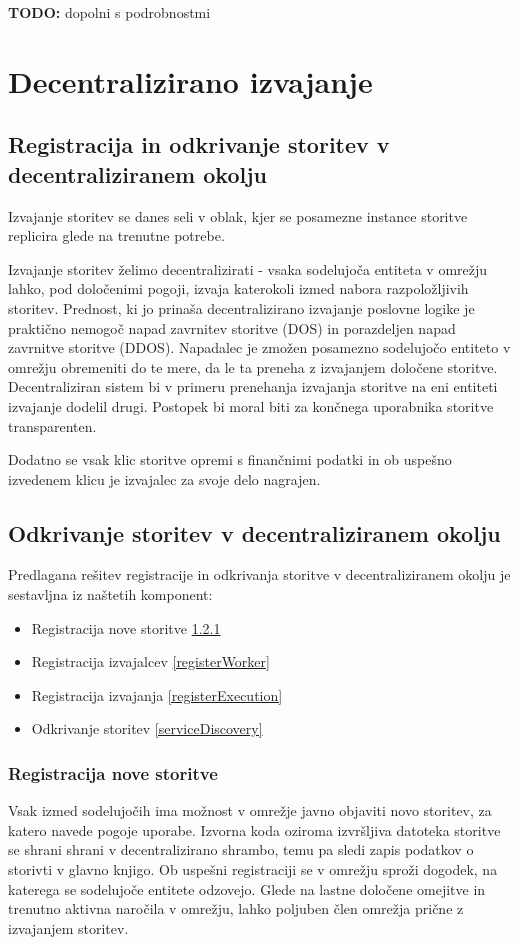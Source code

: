 \documentclass[a4paper, 12pt]{book}
\begin{document}
\textbf{TODO:} dopolni s podrobnostmi

\chapter{Decentralizirano izvajanje}
\label{ch4}

\section{Registracija in odkrivanje storitev v decentraliziranem okolju}

Izvajanje storitev se danes seli v oblak, kjer se posamezne instance storitve replicira glede na trenutne potrebe.

Izvajanje storitev želimo decentralizirati - vsaka sodelujoča entiteta v omrežju lahko, pod določenimi pogoji, izvaja
katerokoli izmed nabora razpoložljivih storitev.
Prednost, ki jo prinaša decentralizirano izvajanje poslovne logike je praktično nemogoč napad zavrnitev storitve (DOS) in
porazdeljen napad zavrnitve storitve (DDOS).
Napadalec je zmožen posamezno sodelujočo entiteto v omrežju obremeniti do te mere, da le ta preneha z izvajanjem določene storitve.
Decentraliziran sistem bi v primeru prenehanja izvajanja storitve na eni entiteti izvajanje dodelil drugi. Postopek bi moral biti za končnega uporabnika storitve transparenten.

Dodatno se vsak klic storitve opremi s finančnimi podatki in ob uspešno izvedenem klicu je izvajalec za svoje delo nagrajen.

\section{Odkrivanje storitev v decentraliziranem okolju}
Predlagana rešitev registracije in odkrivanja storitve v decentraliziranem okolju je sestavljna iz naštetih komponent:
\begin{itemize}
	\item Registracija nove storitve \ref{registerService}
	\item Registracija izvajalcev \ref{registerWorker}
	\item Registracija izvajanja \ref{registerExecution}
	\item Odkrivanje storitev \ref{serviceDiscovery}
\end{itemize}

\subsection{Registracija nove storitve}
\label{registerService}
Vsak izmed sodelujočih ima možnost v omrežje javno objaviti novo storitev, za katero navede pogoje uporabe.
Izvorna koda oziroma izvršljiva datoteka storitve se shrani shrani v decentralizirano shrambo, temu pa sledi zapis podatkov o storivti v glavno knjigo.
Ob uspešni registraciji se v omrežju sproži dogodek, na katerega se sodelujoče entitete odzovejo.
Glede na lastne določene omejitve in trenutno aktivna naročila v omrežju, lahko poljuben člen omrežja prične z izvajanjem storitev.
\end{document}
